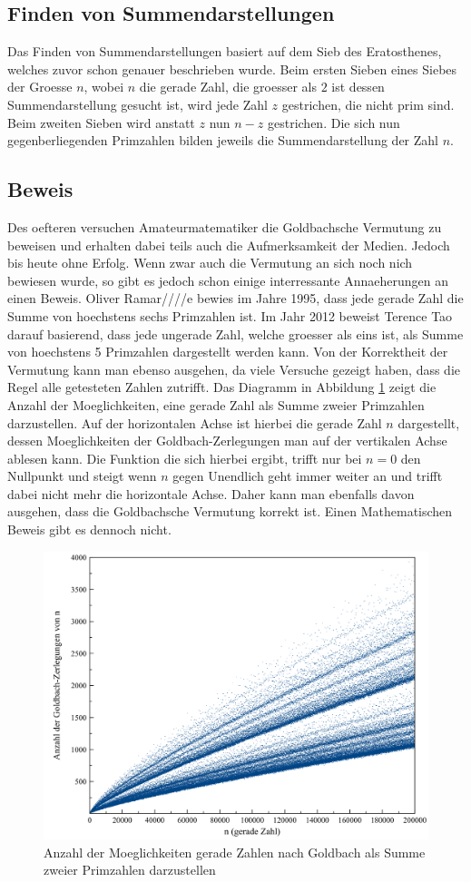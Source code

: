 \subsection{Finden von Summendarstellungen}
Das Finden von Summendarstellungen basiert auf dem Sieb des Eratosthenes, welches zuvor schon genauer beschrieben wurde. Beim ersten Sieben eines Siebes der Groesse $n$, wobei $n$ die gerade Zahl, die groesser als $2$ ist dessen Summendarstellung gesucht ist, wird jede Zahl $z$ gestrichen, die nicht prim sind. Beim zweiten Sieben wird anstatt $z$ nun $n - z$ gestrichen. Die sich nun gegenberliegenden Primzahlen bilden jeweils die Summendarstellung der Zahl $n$.
\subsection{Beweis}
Des oefteren versuchen Amateurmatematiker die Goldbachsche Vermutung zu beweisen und erhalten dabei teils auch die Aufmerksamkeit der Medien. Jedoch bis heute ohne Erfolg. Wenn zwar auch die Vermutung an sich noch nich bewiesen wurde, so gibt es jedoch schon einige interressante Annaeherungen an einen Beweis.
Oliver Ramar////e bewies im Jahre 1995, dass jede gerade Zahl die Summe von hoechstens sechs Primzahlen ist. Im Jahr 2012 beweist Terence Tao darauf basierend, dass jede ungerade Zahl, welche groesser als eins ist, als Summe von hoechstens 5 Primzahlen dargestellt werden kann.
Von der Korrektheit der Vermutung kann man ebenso ausgehen, da viele Versuche gezeigt haben, dass die Regel alle getesteten Zahlen zutrifft. Das Diagramm in Abbildung \ref{fig:goldbach_diagramm} zeigt die Anzahl der Moeglichkeiten, eine gerade Zahl als Summe zweier Primzahlen darzustellen. Auf der horizontalen Achse ist hierbei die gerade Zahl $n$ dargestellt, dessen Moeglichkeiten der Goldbach-Zerlegungen man auf der vertikalen Achse ablesen kann. Die Funktion die sich hierbei ergibt, trifft nur bei $n = 0$ den Nullpunkt und steigt wenn $n$ gegen Unendlich geht immer weiter an und trifft dabei nicht mehr die horizontale Achse. Daher kann man ebenfalls davon ausgehen, dass die Goldbachsche Vermutung korrekt ist. Einen Mathematischen Beweis gibt es dennoch nicht.
\begin{figure}
\includegraphics[width=0.8\linewidth]{img/Goldbach200000.png}
\caption{Anzahl der Moeglichkeiten gerade Zahlen nach Goldbach als Summe zweier Primzahlen darzustellen}
\label{fig:goldbach_diagramm}
\end{figure}
